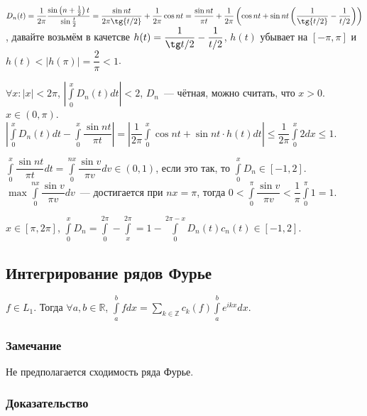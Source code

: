 \documentclass{article}
\begin{document}
            $D_n(t) = \dfrac{1}{2 \pi} \dfrac{\sin \left(n + \frac{1}{2} \right) t}{\sin \frac{t}{2} } = \dfrac{\sin {nt}}{2 \pi \tg {t / 2}} + \dfrac{1}{2 \pi} \cos nt = \dfrac{\sin nt}{\pi t} + \dfrac{1}{2 \pi} \left( \cos {nt} + \sin {nt} \left( \dfrac{1}{\tg {t / 2}} - \dfrac{1}{t/2} \right) \right)$, давайте возьмём в качетсве $h(t) = \dfrac{1}{\tg t / 2} - \dfrac{1}{t / 2}$, $h(t)$ убывает на $[-\pi, \pi]$ и $h(t) < | h(\pi) | = \dfrac{2}{\pi} < 1$.
            
            $\forall x : |x| < 2 \pi$, $\left| \int\limits^x_0 D_n(t) dt \right| < 2$, $D_n$~--- чётная, можно считать, что $x > 0$. $x \in (0, \pi)$. $\left| \int\limits^x_0 D_n(t) dt - \int\limits^x_0 \dfrac{\sin {nt}}{\pi t} \right| = \left| \dfrac{1}{2 \pi} \int\limits^x_0 \cos {nt} + \sin {nt} \cdot h(t) dt \right| \leqslant \dfrac{1}{2 \pi} \int\limits^x_0 2 dx \leqslant 1$.
            
            $\int\limits^x_0 \dfrac{\sin {nt}}{\pi t} dt = \int\limits^{nx}_0 \dfrac{\sin v}{\pi v} dv \in (0, 1)$, если это так, то $\int\limits^x_0 D_n \in [-1, 2]$. $\max \int\limits^{nx}_0 \dfrac{\sin v}{\pi v} dv$~--- достигается при $nx = \pi$, тогда $0 < \int\limits^{\pi}_0 \dfrac{\sin v}{\pi v} < \dfrac{1}{\pi} \int\limits^{\pi}_0 1 = 1$.
            
            $x \in [\pi, 2 \pi]$, $\int\limits^x_0 D_n = \int\limits^{2 \pi}_0 - \int\limits^{2\pi}_x = 1 - \int\limits^{2 \pi - x}_0 D_n(t) c_n(t) \in [-1, 2]$.
                
    \subsection{Интегрирование рядов Фурье}
        
        $f \in L_1$. Тогда $\forall a, b \in \mathbb{R}$, $\int\limits^b_a f dx = \sum\limits_{k \in \mathbb{Z}} c_k(f) \int\limits^b_a e^{ikx} dx$.
        
        \subsubsection{Замечание}
        
            Не предполагается сходимость ряда Фурье.
            
        \subsubsection{Доказательство}
        
\end{document}
